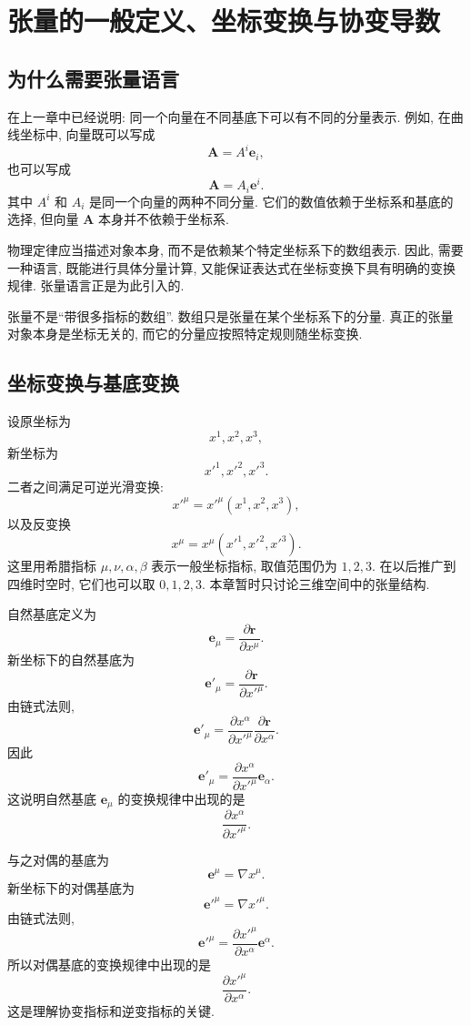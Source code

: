 \chapter{张量的一般定义、坐标变换与协变导数}

\section{为什么需要张量语言}

在上一章中已经说明: 同一个向量在不同基底下可以有不同的分量表示. 例如, 在曲线坐标中, 向量既可以写成
\[
\bm{A}=A^i\bm{e}_i,
\]
也可以写成
\[
\bm{A}=A_i\bm{e}^i.
\]
其中 $A^i$ 和 $A_i$ 是同一个向量的两种不同分量. 它们的数值依赖于坐标系和基底的选择, 但向量 $\bm{A}$ 本身并不依赖于坐标系. 

物理定律应当描述对象本身, 而不是依赖某个特定坐标系下的数组表示. 因此, 需要一种语言, 既能进行具体分量计算, 又能保证表达式在坐标变换下具有明确的变换规律. 张量语言正是为此引入的. 

张量不是“带很多指标的数组”. 数组只是张量在某个坐标系下的分量. 真正的张量对象本身是坐标无关的, 而它的分量应按照特定规则随坐标变换. 

\section{坐标变换与基底变换}

设原坐标为
\[
x^1,x^2,x^3,
\]
新坐标为
\[
x'^1,x'^2,x'^3.
\]
二者之间满足可逆光滑变换: 
\[
x'^\mu=x'^\mu(x^1,x^2,x^3),
\]
以及反变换
\[
x^\mu=x^\mu(x'^1,x'^2,x'^3).
\]
这里用希腊指标 $\mu,\nu,\alpha,\beta$ 表示一般坐标指标, 取值范围仍为 $1,2,3$. 在以后推广到四维时空时, 它们也可以取 $0,1,2,3$. 本章暂时只讨论三维空间中的张量结构. 

自然基底定义为
\[
\bm{e}_\mu
=
\frac{\partial \bm{r}}{\partial x^\mu}.
\]
新坐标下的自然基底为
\[
\bm{e}'_\mu
=
\frac{\partial \bm{r}}{\partial x'^\mu}.
\]
由链式法则, 
\[
\bm{e}'_\mu
=
\frac{\partial x^\alpha}{\partial x'^\mu}
\frac{\partial \bm{r}}{\partial x^\alpha}.
\]
因此
\[
\bm{e}'_\mu
=
\frac{\partial x^\alpha}{\partial x'^\mu}
\bm{e}_\alpha.
\]
这说明自然基底 $\bm{e}_\mu$ 的变换规律中出现的是
\[
\frac{\partial x^\alpha}{\partial x'^\mu}.
\]

与之对偶的基底为
\[
\bm{e}^\mu=\nabla x^\mu.
\]
新坐标下的对偶基底为
\[
\bm{e}'^\mu=\nabla x'^\mu.
\]
由链式法则, 
\[
\bm{e}'^\mu
=
\frac{\partial x'^\mu}{\partial x^\alpha}
\bm{e}^\alpha.
\]
所以对偶基底的变换规律中出现的是
\[
\frac{\partial x'^\mu}{\partial x^\alpha}.
\]
这是理解协变指标和逆变指标的关键. 

